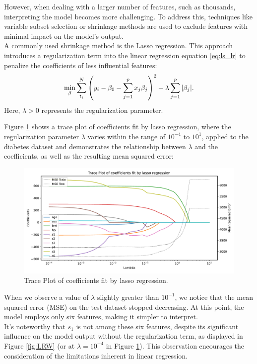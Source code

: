 However, when dealing with a larger number of features, such as thousands, interpreting the model becomes more challenging. To address this, techniques like variable subset selection or shrinkage methods are used to exclude features with minimal impact on the model's output. \\
A commonly used shrinkage method is the Lasso regression. This approach introduces a regularization term into the linear regression equation \ref{eq:ls_lr} to penalize the coefficients of less influential features:
\begin{equation}
    \min_{\beta} \sum_{t_i}^N \left(y_i-\beta_0-\sum_{j=1}^p x_j\beta_j\right)^2 + \lambda \sum_{j=1}^p |\beta_j|.
\end{equation}
Here, $\lambda > 0$ represents the regularization parameter.\cite{hastie2009elements}

Figure \ref{fig:lasso_fit} shows a trace plot of coefficients fit by lasso regression, where the regularization parameter $\lambda$ varies within the range of $10^{-4}$ to $10^1$, applied to the diabetes dataset and demonstrates the relationship between $\lambda$ and the coefficients, as well as the resulting mean squared error:
\begin{figure}[H]
    \centering
    \includegraphics[width=1\linewidth]{pics/Trace_Plot_of_Lasso_Fit.pdf}
    \caption{Trace Plot of coefficients fit by lasso regression.}
    \label{fig:lasso_fit}
\end{figure}

When we observe a value of $\lambda$ slightly greater than $10^{-1}$, we notice that the mean squared error (MSE) on the test dataset stopped decreasing. At this point, the model employs only six features, making it simpler to interpret.\\
It's noteworthy that $s_1$ is not among these six features, despite its significant influence on the model output without the regularization term, as displayed in Figure \ref{fig:LRW} (or at $\lambda=10^{-4}$ in Figure \ref{fig:lasso_fit}). This observation encourages the consideration of the limitations inherent in linear regression.


